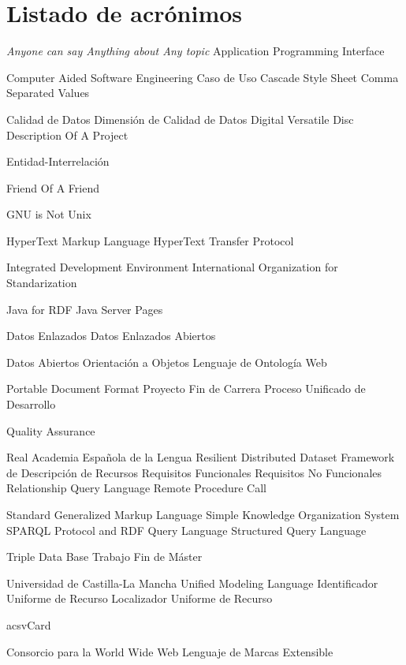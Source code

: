 \chapter{Listado de acrónimos}
{\small
\begin{acronym}[XXXXXXXX]
       {\textit{Anyone can say Anything about Any topic}}
       {Application Programming Interface}

      {Computer Aided Software Engineering}
       {Caso de Uso}
       {Cascade Style Sheet}
       {Comma Separated Values}

        {Calidad de Datos}
       {Dimensión de Calidad de Datos}
       {Digital Versatile Disc}
      {Description Of A Project}

        {Entidad-Interrelación}

      {Friend Of A Friend}

       {\acs{GNU} is Not Unix}

      {HyperText Markup Language}
      {HyperText Transfer Protocol}

       {Integrated Development Environment}
       {International Organization for Standarization}

      {Java for \acs{RDF}}
       {Java Server Pages}

        {Datos Enlazados}
       {Datos Enlazados Abiertos}

        {Datos Abiertos}
        {Orientación a Objetos}
       {Lenguaje de Ontología Web}

       {Portable Document Format}
       {Proyecto Fin de Carrera}
       {Proceso Unificado de Desarrollo}

        {Quality Assurance}

       {Real Academia Española de la Lengua}
       {Resilient Distributed Dataset}
       {Framework de Descripción de Recursos}
        {Requisitos Funcionales}
       {Requisitos No Funcionales}
       {Relationship Query Language}
       {Remote Procedure Call}

      {Standard Generalized Markup Language}
      {Simple Knowledge Organization System}
    {\acs{SPARQL} Protocol and RDF Query Language}
       {Structured Query Language}

       {Triple Data Base}
       {Trabajo Fin de Máster}

      {Universidad de Castilla-La Mancha}
       {Unified Modeling Language}
       {Identificador Uniforme de Recurso}
       {Localizador Uniforme de Recurso}

     {acs{vCard}}

       {Consorcio para la World Wide Web}
       {Lenguaje de Marcas Extensible}

\end{acronym}
}


